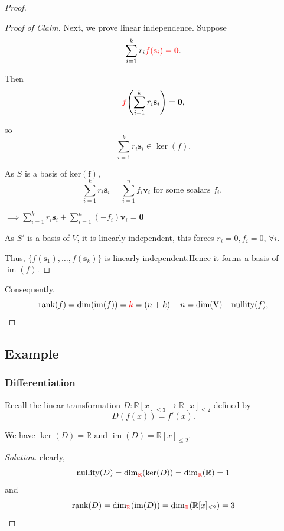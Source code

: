 \documentclass[12pt]{article}
\newenvironment{solution}
{\begin{proof}[Solution]}
{\end{proof}}
\begin{document}
\begin{proof}
\begin{proof}[Proof of Claim]
Next, we prove linear independence. Suppose
\[
\sum_{i=1}^{k}r_i\textcolor{red}{f(\mathbf{s}_i)=\mathbf{0}}.
\]

Then
\[
\textcolor{red}{f}\!\left(
\sum_{i=1}^{k}r_i\mathbf{s}_i
\right)
= \mathbf{0},
\]

so
\[
\sum_{i=1}^{k}r_i\mathbf{s}_i\in\operatorname{ker}(f).
\]

As $S$ is a basis of $\operatorname{ker(f)}$,
\[
\sum_{i=1}^{k}r_i\mathbf{s}_i=\sum_{i=1}^{n}f_i\mathbf{v}_i \text{ for some scalars $f_i$. }
\]

$\implies\sum_{i=1}^{k}r_i\mathbf{s}_i+\sum_{i=1}^{n}(-f_i)\mathbf{v}_i=\mathbf{0}$

\medskip

As $S'$ is a basis of $V$, it is linearly independent, this forces $r_i=0, f_i = 0$, $\forall i$.

Thus, $\{f(\mathbf{s}_1),\ldots,f(\mathbf{s}_k)\}$ is linearly independent.Hence it forms a basis of $\operatorname{im}(f)$.

\end{proof}

Consequently,
\[
\operatorname{rank}(f)=\operatorname{dim}(\operatorname{im}(f))=\textcolor{red}{k}=(n+k)-n=\operatorname{dim(V)}-\operatorname{nullity}(f),
\]

\end{proof}

\subsection{Example}

\subsubsection{Differentiation}

Recall the linear transformation $D:\mathbb{R}[x]_{\le3}\longrightarrow \mathbb{R}[x]_{\le2}$ defined by
\[
D(f(x))=f'(x).
\]

We have $\operatorname{ker}(D)=\mathbb{R}\text{ and }\operatorname{im}(D)=\mathbb{R}[x]_{\le2}$.
\begin{solution}
clearly,
\[
\operatorname{nullity}(D)= \operatorname{dim}_{\textcolor{red}{\mathbb{R}}}(\operatorname{ker}(D))=\operatorname{dim}_{\textcolor{red}{\mathbb{R}}}(\mathbb{R})=1
\]   
and
\[
\operatorname{rank}(D)=\operatorname{dim}_{\textcolor{red}{\mathbb{R}}}(\operatorname{im}(D))=\operatorname{dim}_{\textcolor{red}{\mathbb{R}}}(\mathbb{R}[x]_{\le2})=3
\] 
\end{solution}
\end{document}
